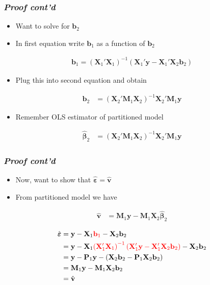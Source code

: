 \documentclass[xcolor=dvipsnames]{beamer}
\begin{document}
\begin{frame}\frametitle{\textit{Proof cont'd}}
\begin{itemize}
    \item Want to solve for $\mathbf{b}_2$
    \item In first equation write $\mathbf{b}_1$ as a function of $\mathbf{b}_2$
\end{itemize}

\begin{align*}
    \mathbf{b}_1 = \left(\mathbf{X}_1'\mathbf{X}_1\right)^{-1}\left(\mathbf{X}_1'\mathbf{y} - \mathbf{X}_1'\mathbf{X}_2\mathbf{b}_2\right)
\end{align*}
\begin{itemize}
    \item Plug this into second equation and obtain
\end{itemize}
\begin{align*}
    \mathbf{b}_2 &=\left(\mathbf{X}_2'\mathbf{M}_1\mathbf{X}_2\right)^{-1}\mathbf{X}_2'\mathbf{M}_1\mathbf{y}
\end{align*}
\begin{itemize}
    \item Remember OLS estimator of partitioned model
\end{itemize}
\begin{align*}
    \hat{\boldsymbol{\beta}}_2 &=
    \left(\mathbf{X}_2'\mathbf{M}_1\mathbf{X}_2\right)^{-1}\mathbf{X}_2'\mathbf{M}_1\mathbf{y}
\end{align*}
\end{frame}

\begin{frame}\frametitle{\textit{Proof cont'd}}
\begin{itemize}
    \item Now, want to show that $\hat{\boldsymbol{\varepsilon}}=\hat{\mathbf{v}}$
    \item From partitioned model we have
\end{itemize}
\begin{align*}
\hat{\mathbf{v}} &= \mathbf{M}_1\mathbf{y}-\mathbf{M}_1\mathbf{X}_2\hat{\boldsymbol{\beta}}_2
\end{align*}

\begin{align*}
    \hat{\boldsymbol{\varepsilon}}
    &= \mathbf{y}-\mathbf{X}_1{\color{red}{\mathbf{b}_1}}-\mathbf{X}_2\mathbf{b}_2 \\
    &= \mathbf{y}-\mathbf{X}_1{\color{red}{\left(\mathbf{X}_1'\mathbf{X}_1\right)^{-1}\left(\mathbf{X}_1'\mathbf{y}-\mathbf{X}_1'\mathbf{X}_2\mathbf{b}_2\right)}} -\mathbf{X}_2\mathbf{b}_2\\
    &= \mathbf{y}-\mathbf{P}_1\mathbf{y}-\left(\mathbf{X}_2\mathbf{b}_2-\mathbf{P}_1\mathbf{X}_2\mathbf{b}_2 \right)\\
    &= \mathbf{M}_1\mathbf{y}-\mathbf{M}_1\mathbf{X}_2\mathbf{b}_2\\
    &= \hat{\mathbf{v}}
\end{align*}

\end{frame}
\end{document}
